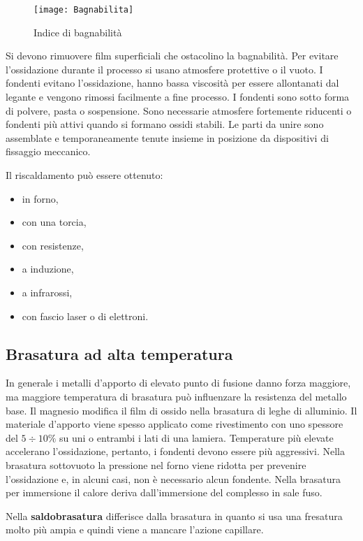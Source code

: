 \begin{figure}
\centering
\texttt{[image: Bagnabilita]}
\caption{Indice di bagnabilità}
\label{fig:Bagnabilita}
\end{figure}

Si devono rimuovere film superficiali che ostacolino la bagnabilità.
Per evitare l'ossidazione durante il processo si usano atmosfere protettive o il vuoto.
I fondenti evitano l'ossidazione, hanno bassa viscosità per essere allontanati dal legante e vengono rimossi facilmente a fine processo.
I fondenti sono sotto forma di polvere, pasta o sospensione.
Sono necessarie atmosfere fortemente riducenti o fondenti più attivi quando si formano ossidi stabili.
Le parti da unire sono assemblate e temporaneamente tenute insieme in posizione da dispositivi di fissaggio meccanico.

Il riscaldamento può essere ottenuto:
\begin{itemize}
\item in forno,
\item con una torcia,
\item con resistenze,
\item a induzione,
\item a infrarossi,
\item con fascio laser o di elettroni.
\end{itemize}

\subsection{Brasatura ad alta temperatura}
In generale i metalli d'apporto di elevato punto di fusione danno forza maggiore, ma maggiore temperatura di brasatura può influenzare la resistenza del metallo base.
Il magnesio modifica il film di ossido nella brasatura di leghe di alluminio.
Il materiale d'apporto viene spesso applicato come rivestimento con uno spessore del $5 \div 10\%$ su uni o entrambi i lati di una lamiera.
Temperature più elevate accelerano l'ossidazione, pertanto, i fondenti devono essere più aggressivi.
Nella brasatura sottovuoto la pressione nel forno viene ridotta per prevenire l'ossidazione e, in alcuni casi, non è necessario alcun fondente.
Nella brasatura per immersione il calore deriva dall'immersione del complesso in sale fuso.

Nella \textbf{saldobrasatura} differisce dalla brasatura in quanto si usa una fresatura molto più ampia e quindi viene a mancare l'azione capillare.

